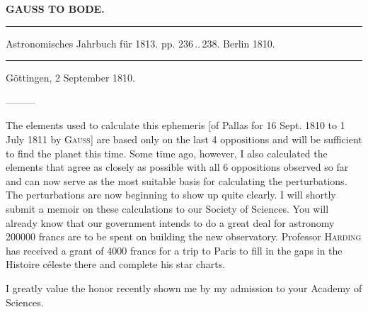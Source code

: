 \clearpage{}

\begin{center}\textbf{GAUSS TO BODE.}\par\vspace{4pt}\hrule\vspace{4pt}\fontsize{10}{12}\selectfont Astronomisches Jahrbuch für 1813. pp. 236\,..\,238. Berlin 1810.\par\vspace{4pt}\hrule\vspace{4pt}\end{center}
\begin{flushright}Göttingen, 2 September 1810.\end{flushright}

\par\indent ---\enspace---\enspace---

\par\indent The elements used to calculate this ephemeris [of Pallas for 16 Sept. 1810 to 1 July 1811 by \textsc{Gauss}] are based only on the last 4 oppositions and will be sufficient to find the planet this time. Some time ago, however, I also calculated the elements that agree as closely as possible with all 6 oppositions observed so far and can now serve as the most suitable basis for calculating the perturbations. The perturbations are now beginning to show up quite clearly. I will shortly submit a memoir on these calculations to our Society of Sciences. You will already know that our government intends to do a great deal for astronomy 200000 francs are to be spent on building the new observatory. Professor \textsc{Harding} has received a grant of 4000 francs for a trip to Paris to fill in the gaps in the Histoire céleste there and complete his star charts.

I greatly value the honor recently shown me by my admission to your Academy of Sciences.

